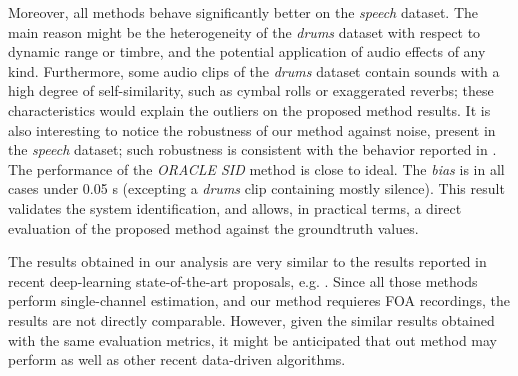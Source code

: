 Moreover, all methods behave significantly better on the \textit{speech} dataset. The main reason might be the heterogeneity of the \textit{drums} dataset with respect to dynamic range or timbre, and the potential application of audio effects of any kind.
Furthermore, some audio clips of the \textit{drums} dataset contain sounds with a high degree of self-similarity, such as cymbal rolls or exaggerated reverbs; these characteristics would explain the outliers on the proposed method results.
It is also interesting to notice the robustness of our method against noise, present in the \textit{speech} dataset; 
such robustness is consistent with the behavior reported in \cite{jukic2015group}.\\

The performance of the \textit{ORACLE SID} method is close to ideal. The \textit{bias} is in all cases under 0.05 s (excepting a \textit{drums} clip containing mostly silence).
This result validates the system identification, and allows, in practical terms, a direct evaluation of the proposed method against the groundtruth values.

The results obtained in our analysis are very similar to the results reported in recent deep-learning state-of-the-art proposals, e.g. \cite{gamper2018blind}. 
Since all those methods perform single-channel estimation, and our method requieres FOA recordings, the results are not directly comparable. However, given the similar results obtained with the same evaluation metrics, it might be anticipated that out method may perform as well as other recent data-driven algorithms.



